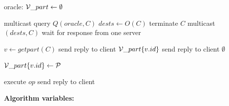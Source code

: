 \begin{algorithm}
\small
\begin{distribalgo}[1]
\vspace{1mm}

    \STATE  oracle: $\mathcal{V}\_part \leftarrow \emptyset$
\ENDINDENT

\vspace{1.5mm}

	\STATE multicast query $Q(oracle, C)$ \label{algline:query_oracle} 
    \STATE $dests \leftarrow O(C)$ \label{algline:oracle_response} 
    	\STATE terminate $C$ \label{algline:cli_terminate}
    \ELSE
    	\STATE multicast$(dests, C)$ \label{algline:cli_mcast}
    	\STATE wait for response from one server
    \ENDIF
\ENDINDENT

\vspace{1.5mm}

		\STATE $v \leftarrow get part(C)$
			\STATE send reply to client $\mathcal{V}\_part\{v.id\}$
		\ELSE
			\STATE send reply to client $\emptyset$
		\ENDIF
	\ENDINDENT

		\STATE $\mathcal{V}\_part\{v.id\} \leftarrow \mathcal{P}$
	\ENDINDENT

\ENDINDENT

\vspace{1.5mm}

		\STATE execute $op$ \label{algline:executeopck}
		\STATE send reply to client \label{algline:sendreply}
	\ENDINDENT
\ENDINDENT

\vspace{1.5mm}

\textbf{Algorithm variables:}

\vspace{1mm}


\end{distribalgo}
\end{algorithm}
